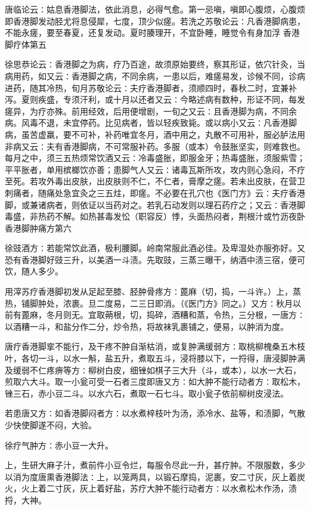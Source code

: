 \documentclass[a4paper,12pt,UTF8,twoside]{ctexbook}
\begin{document}
唐临论云∶姑息香港脚法，依此消息，必得气愈。第一忌嗔，嗔即心腹烦，心腹烦即香港脚发动胫尤将息侵犀，七度，顶少似瘥。若洗之苏敬论云∶凡香港脚病患，不能永瘥，要至春夏，还复发动。夏时腠理开，不宜卧睡，睡觉令有身加浮
香港脚疗体第五

徐思恭论云∶香港脚之为病，疗乃百途，故须原始要终，察其形证，依穴针灸，当病用药，如又云∶香港脚之病，不同余病，一患以后，难瘥易发，诊候不同，诊病进药，随其冷热，旬月苏敬论云∶夫疗香港脚者，须顺四时，春秋二时，宜兼补泻。夏则疾盛，专须汗利，或十月以还者又云∶今略述病有数种，形证不同，每发瘥异，为疗亦殊。前用经效，后用便增剧，一旬之又云∶且香港脚为病，不同余病。风毒不退，未宜停药。比见病者，皆以轻疾致毙。或以病小又云∶凡香港脚病，虽苦虚羸，要不可补，补药唯宜冬月，酒中用之，丸散不可用补，服必胪法用非病又云∶夫有香港脚病，不可常服补药。多服（或本）令鼓胀坚实，则难救也。每月之中，须三五热烦常饮酒又云∶冷毒盛胀，即服金牙；热毒盛胀，须服紫雪；平平胀者，单用槟榔饮亦善；患脚气人又云∶诸毒瓦斯所攻，攻内则心急闷，不疗至死。若攻外毒出皮肤，出皮肤则不仁，不仁者，膏摩之瘥。若未出皮肤，在营卫刺痛者，随痛处急宜灸之三五炷，即瘥。不必要在孔穴也《医门方》云∶夫疗香港脚，或兼诸病者，则依证以当药对之。若乳石动发则以理石药疗之；又云∶香港脚毒盛，非热药不解。如热甚毒发忪（职容反）悸，头面热闷者，荆根汁或竹沥夜卧
香港脚肿痛方第六

徐豉酒方∶若能常饮此酒，极利腰脚。岭南常服此酒必佳。及卑湿处亦服弥好。又恐有香港脚好豉三升，以美酒一斗渍。先取豉，三蒸三曝干，纳酒中渍三宿，便可饮，随人多少。

用滓苏疗香港脚初发从足起至膝、胫肿骨疼方∶蓖麻（切，捣，一斗许。）上，蒸热，铺脚肿处，浓裹。旦二度易，二三日即消。（《医门方》同之。）又方∶秋月以前有蓖麻，冬月则无。宜取蒴根，切，捣碎，酒糟和蒸，令热，三分根，一唐方∶以酒糟一斗，和盐分作二分，炒令热，将故袜乳裹铺之，便易，以肿消为度。

唐疗香港脚挛不能行，及干疼不肿自渐枯消，或复肿满缓弱方∶取桃柳槐桑五木枝叶，各切一斗，以水一斛，盐五升，煮取五斗，浸将膝以下，一捋得，唐浸脚肿满及缓弱不仁疼痹等方∶柳树白皮，细锉如棋子三大升（斗，或本），以水一大石，煎取六大斗。取一小瓮可受一石者三度即唐又方∶如大肿不能行动者方∶取松木，锉三石，赤小豆二斗。以水六石，煮取一石七斗。取小瓮子依前柳树皮浸法。

若患唐又方∶如香港脚闷者方∶以水煮梓枝叶为汤，添冷水、盐等，和渍脚，气散少快使脚遂不闷，大验。

徐疗气肿方∶赤小豆一大升。

上，生研大麻子汁，煮前件小豆令烂，每服令尽此一升，甚疗肿。不限服数，多少以消为度唐熏香港脚法∶上，以笼两具，以锻石摩捣，泥裹，安二寸灰，灰上着炭火，火上着二寸灰，灰上着好盐，苏疗大肿不能行动者方∶以水煮松木作汤，渍捋，大神。
\end{document}
